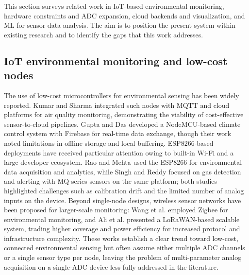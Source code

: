 \documentclass[journal,onecolumn]{IEEEtran}
\begin{document}
This section surveys related work in IoT-based environmental monitoring, hardware constraints and ADC expansion, cloud backends and visualization, and ML for sensor data analysis. The aim is to position the present system within existing research and to identify the gaps that this work addresses.
\subsection{IoT environmental monitoring and low-cost nodes}
The use of low-cost microcontrollers for environmental sensing has been widely reported. Kumar and Sharma \cite{sensorcloud2019} integrated such nodes with MQTT and cloud platforms for air quality monitoring, demonstrating the viability of cost-effective sensor-to-cloud pipelines. Gupta and Das \cite{iotclimate2021} developed a NodeMCU-based climate control system with Firebase for real-time data exchange, though their work noted limitations in offline storage and local buffering. ESP8266-based deployments have received particular attention owing to built-in Wi-Fi and a large developer ecosystem. Rao and Mehta \cite{esp8266data2022} used the ESP8266 for environmental data acquisition and analytics, while Singh and Reddy \cite{iotgas2023} focused on gas detection and alerting with MQ-series sensors on the same platform; both studies highlighted challenges such as calibration drift and the limited number of analog inputs on the device. Beyond single-node designs, wireless sensor networks have been proposed for larger-scale monitoring: Wang et al. \cite{zigbeewsn2018} employed Zigbee for environmental monitoring, and Ali et al. \cite{lorawan2020} presented a LoRaWAN-based scalable system, trading higher coverage and power efficiency for increased protocol and infrastructure complexity. These works establish a clear trend toward low-cost, connected environmental sensing but often assume either multiple ADC channels or a single sensor type per node, leaving the problem of multi-parameter analog acquisition on a single-ADC device less fully addressed in the literature.
\end{document}
